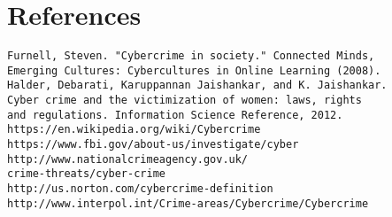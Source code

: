 \documentclass[12pt]{article}
\begin{document}
\section{References}
\begin{verbatim}
Furnell, Steven. "Cybercrime in society." Connected Minds,
Emerging Cultures: Cybercultures in Online Learning (2008).
Halder, Debarati, Karuppannan Jaishankar, and K. Jaishankar.
Cyber crime and the victimization of women: laws, rights
and regulations. Information Science Reference, 2012.
https://en.wikipedia.org/wiki/Cybercrime
https://www.fbi.gov/about-us/investigate/cyber
http://www.nationalcrimeagency.gov.uk/
crime-threats/cyber-crime
http://us.norton.com/cybercrime-definition
http://www.interpol.int/Crime-areas/Cybercrime/Cybercrime
\end{verbatim}
\end{document}
